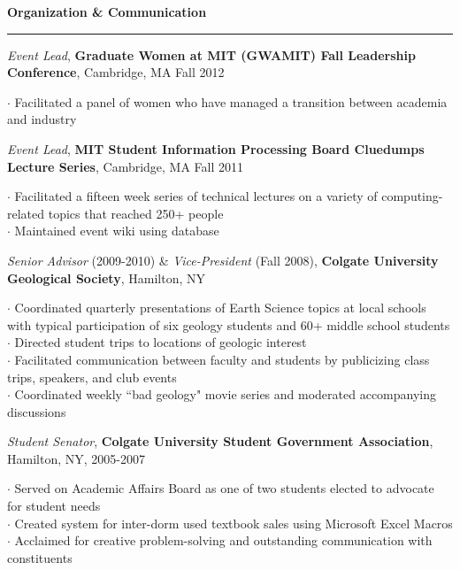 \documentclass[11pt]{article}
\begin{document}
\begin{comment}
\smallskip
\textbf{Research Student}, \emph{Colgate University Geology Laboratories}, Hamilton, NY, Feb.--May 2008 \\
\begin{small}$\cdot$ {Used remote sensing software to create a data system from the digital data of existing satellite images, weather, and climate data }\end{small}
\smallskip
\end{comment}

\vspace*{0.25 mm}
\textbf{Organization \& Communication}
\smallskip
\hrule
\emph{Event Lead}, \textbf{Graduate Women at MIT (GWAMIT) Fall Leadership Conference}, Cambridge, MA Fall 2012\\
\begin{small}$\cdot$ {Facilitated a panel of women who have managed a transition between academia and industry}\end{small}

\emph{Event Lead}, \textbf{MIT Student Information Processing Board Cluedumps Lecture Series}, Cambridge, MA Fall 2011\\
\begin{small}$\cdot$ {Facilitated a fifteen week series of technical lectures on a variety of computing-related topics that reached 250+ people}\\
$\cdot$ {Maintained event wiki using database}\end{small}

\emph{Senior Advisor} (2009-2010) \& \emph{Vice-President} (Fall 2008), \textbf{Colgate University Geological Society}, Hamilton, NY \\
\begin{small}$\cdot$ {Coordinated quarterly presentations of Earth Science topics at local schools with typical participation of six geology students and 60+ \hspace*{1 mm} middle school students} \\
$\cdot$ {Directed student trips to locations of geologic interest } \\
$\cdot$ {Facilitated communication between faculty and students by publicizing class trips, speakers, and club events } \\
$\cdot$ {Coordinated weekly ``bad geology" movie series and moderated accompanying discussions}\end{small}

\emph{Student Senator}, \textbf{Colgate University Student Government Association}, Hamilton, NY, 2005-2007  \\
\begin{small}$\cdot$ {Served on Academic Affairs Board as one of two students elected to advocate for student needs }\\
$\cdot$ {Created system for inter-dorm used textbook sales using Microsoft Excel Macros }\\
$\cdot$ {Acclaimed for creative problem-solving and outstanding communication with constituents }\end{small}
\end{document}
